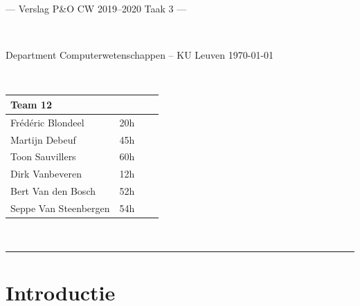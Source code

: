 \documentclass[a4paper,11pt]{article}
\begin{document}
\noindent
\colorbox[HTML]{52BDEC}{\bfseries\parbox{\textwidth}{\centering\large
  --- Verslag P\&O CW 2019--2020 Taak 3 ---
}}
\\[-1mm]
\colorbox[HTML]{00407A}{\bfseries\color{white}\parbox{\textwidth}{
  Department Computerwetenschappen -- KU Leuven
  \hfill
  \today
}}
\\

\smallskip

\noindent
\begin{tabular}{*4l}
\toprule
\multicolumn{2}{l}{\large\textbf{Team 12}} \\
\midrule
Frédéric Blondeel & 20h \\
Martijn Debeuf & 45h \\
Toon Sauvillers & 60h \\ %
Dirk Vanbeveren & 12h \\
Bert Van den Bosch & 52h \\
Seppe Van Steenbergen & 54h \\


\bottomrule
\hline
\end{tabular}\\

\noindent
{\color[HTML]{52BDEC} \rule{\linewidth}{1mm} }

\section{Introductie}\label{sec:introductie}

\end{document}
